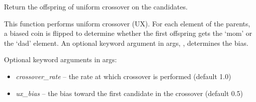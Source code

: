 \documentclass[letterpaper,10pt,english]{sphinxmanual}
\begin{document}

\begin{fulllineitems}
\label{reference:inspyred.ec.variators.uniform_crossover}
Return the offspring of uniform crossover on the candidates.

This function performs uniform crossover (UX). For each element 
of the parents, a biased coin is flipped to determine whether 
the first offspring gets the `mom' or the `dad' element. An 
optional keyword argument in args, , determines the bias.

Optional keyword arguments in args:
\begin{itemize}
\item {} 
\emph{crossover\_rate} -- the rate at which crossover is performed 
(default 1.0)

\item {} 
\emph{ux\_bias} -- the bias toward the first candidate in the crossover 
(default 0.5)

\end{itemize}

\end{fulllineitems}

\end{document}
